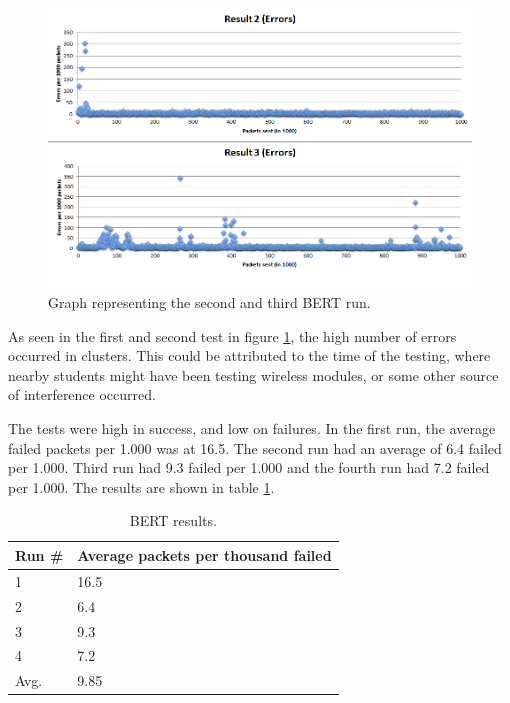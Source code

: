 \begin{figure}[h!]
\hspace*{-2cm}
\includegraphics[width=1.3\textwidth]{chapters/test/figures/res5.png}
\caption{Graph representing the second and third BERT run.}
\label{fig:bert2}
\end{figure}

As seen in the first and second test in figure \ref{fig:bert2}, the high number of errors occurred in clusters. This could be attributed to the time of the testing, where nearby students might have been testing wireless modules, or some other source of interference occurred.

The tests were high in success, and low on failures. In the first run, the average failed packets per 1.000 was at 16.5. The second run had an average of 6.4 failed per 1.000. Third run had 9.3 failed per 1.000 and the fourth run had 7.2 failed per 1.000. The results are shown in table \ref{tab:bertresults}.

\begin{table}[ht!]
\centering
\begin{tabular}{ l l }
Run \# & Average packets per thousand failed \\
\hline
1 & 16.5 \\
2 & 6.4 \\
3 & 9.3 \\
4 & 7.2 \\
\hline
Avg. & 9.85
\end{tabular}

\label{tab:bertresults}
\caption{BERT results.}
\end{table}



